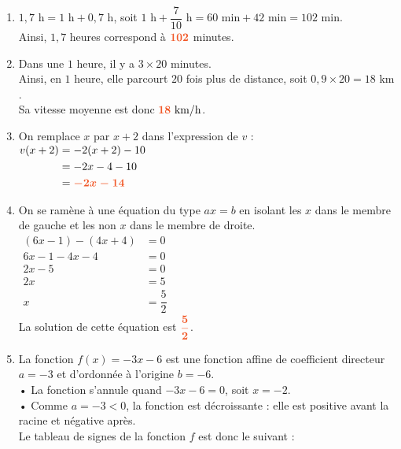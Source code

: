 \documentclass[a4paper,11pt]{article}
\newcounter{seancenum}
\begin{document}
\setcounter{seancenum}{13}
\newpage
\begin{seance}{} %
\begin{enumerate}
\item  $1{,}7\text{ h} =1 \text{ h} + 0{,}7 \text{ h}$, soit $1\text{ h} + \dfrac{7}{10} \text{ h} = 60 \text{ min} + 42\text{ min} = 102 \text{ min}$.\\
          Ainsi, $1{,}7$ heures correspond à ${\color[HTML]{f15929}\boldsymbol{102}}$ {\color[HTML]{f15929}minutes}.


\item Dans une $1$ heure, il y a $3\times 20$ minutes.\\
    Ainsi, en $1$ heure, elle parcourt $20$ fois plus de distance, soit $0{,}9\times 20=18\text{ km}$.\\
    Sa vitesse moyenne est donc ${\color[HTML]{f15929}\boldsymbol{18}}\text{ km/h}$.

\item 
 On remplace $x$ par $x+2$ dans l'expression de $v$ :\\
         $\begin{aligned}
        v(x+2)&=-2(x+2)-10 \\
        &=-2x-4-10\\
        &={\color[HTML]{f15929}\boldsymbol{-2x-14}}
        \end{aligned}$


\item  On se ramène à une équation du type $ax=b$ en isolant les  \og{} $x$ \fg{} dans le membre de gauche et les \og{} non $x$ \fg{} dans le membre de droite.\\
    $\begin{aligned}
    (6x-1)-(4x+4)&=0\\
   6x-1-4x-4&=0\\
 2x-5&=0\\
 2x&=5\\
x&= \dfrac{5}{2}
\end{aligned}$\\
    
   La solution de cette équation est  ${\color[HTML]{f15929}\boldsymbol{\dfrac{5}{2}}}$.


\item  La fonction $f(x) = -3x-6$ est une fonction affine de coefficient directeur $a = -3$ et d'ordonnée à l'origine $b = -6$.\\
    • La fonction s'annule quand $-3x-6 = 0$, soit $x = -2$.\\
    • Comme $a = -3 < 0$, la fonction est décroissante : elle est positive avant la racine et négative après.\\
    Le tableau de signes de la fonction $f$ est donc le suivant :\\



\end{enumerate}
\end{seance}
\end{document}
